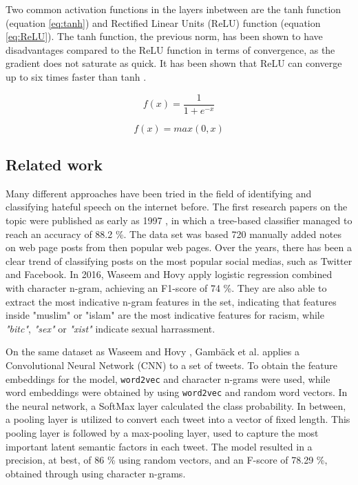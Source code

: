 \documentclass[twocolumn]{article}
\begin{document}
Two common activation functions in the layers inbetween are the tanh function (equation \ref{eq:tanh}) and Rectified Linear Units (ReLU) function (equation \ref{eq:ReLU}). The tanh function, the previous norm, has been shown to have disadvantages compared to the ReLU function in terms of convergence, as the gradient does not saturate as quick. It has been shown that ReLU can converge up to six times faster than tanh \cite{Krizhevsky}.  

\begin{equation}
\label{eq:tanh}
f(x) = \frac{1}{1 + e^{-x}}
\end{equation}

\begin{equation}
\label{eq:ReLU}
f(x) = max(0,x)
\end{equation}


\subsection{Related work}

Many different approaches have been tried in the field of identifying and classifying hateful speech on the internet before. The first research papers on the topic were published as early as 1997 \cite{smokey}, in which a tree-based classifier managed to reach an accuracy of 88.2 \%. The data set was based 720 manually added notes on web page posts from then popular web pages. \cite{smokey} Over the years, there has been a clear trend of classifying posts on the most popular social medias, such as Twitter and Facebook. In 2016, Waseem and Hovy \cite{Waseem2016HatefulSO} apply logistic regression combined with character n-gram, achieving an F1-score of 74 \%. They are also able to extract the most indicative n-gram features in the set, indicating that features inside "muslim" or "islam" are the most indicative features for racism, while \textit{"bitc"}, \textit{"sex"} or \textit{"xist"} indicate sexual harrassment. 

On the same dataset as Waseem and Hovy \cite{Waseem2016HatefulSO}, Gamb\"ack et al. \cite{Gambck2017} applies a Convolutional Neural Network (CNN) to a set of tweets. To obtain the feature embeddings for the model, \verb|word2vec| and character n-grams were used, while word embeddings were obtained by using \verb|word2vec| and random word vectors. In the neural network, a SoftMax layer calculated the class probability. In between, a pooling layer is utilized to convert each tweet into a vector of fixed length. This pooling layer is followed by a max-pooling layer, used to capture the most important latent semantic factors in each tweet. The model resulted in a precision, at best, of 86 \% using random vectors, and an F-score of 78.29 \%, obtained through using character n-grams. 
\end{document}
